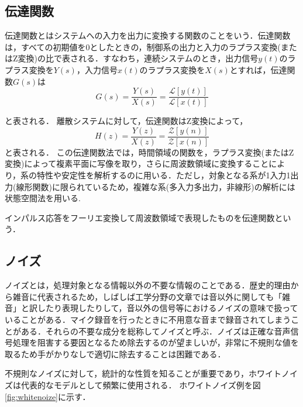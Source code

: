 \documentclass[a4j,11pt]{jsarticle}
\begin{document}
\subsection{伝達関数}
伝達関数とはシステムへの入力を出力に変換する関数のことをいう．伝達関数は，すべての初期値を0としたときの，制御系の出力と入力のラプラス変換(またはZ変換)の比で表される．すなわち，連続システムのとき，出力信号$y(t)$のラプラス変換を$Y(s)$，入力信号$x(t)$のラプラス変換を$X(s)$とすれば，伝達関数$G(s)$は
\begin{equation}
	\label{noref}
  G(s) =  \frac{Y(s)}{X(s)} = \frac{\mathcal{L}[y(t)]}{\mathcal{L}[x(t)]}
\end{equation}

と表される．
離散システムに対して，伝達関数はZ変換によって，
\begin{equation}
	\label{noref}
  H(z) =  \frac{Y(z)}{X(z)} = \frac{\mathcal{Z}[y(n)]}{\mathcal{Z}[x(n)]}
\end{equation}
と表される．
この伝達関数法では，時間領域の関数を，ラプラス変換(またはZ変換)によって複素平面に写像を取り，さらに周波数領域に変換することにより，系の特性や安定性を解析するのに用いる．ただし，対象となる系が1入力1出力(線形関数)に限られているため，複雑な系(多入力多出力，非線形)の解析には状態空間法を用いる.

インパルス応答をフーリエ変換して周波数領域で表現したものを伝達関数という．




\subsection{ノイズ}
ノイズとは，処理対象となる情報以外の不要な情報のことである．歴史的理由から雑音に代表されるため，しばしば工学分野の文章では音以外に関しても「雑音」と訳したり表現したりして，音以外の信号等におけるノイズの意味で扱っていることがある．マイク録音を行ったときに不用意な音まで録音されてしまうことがある．それらの不要な成分を総称してノイズと呼ぶ．ノイズは正確な音声信号処理を阻害する要因となるため除去するのが望ましいが，非常に不規則な値を取るため手がかりなしで適切に除去することは困難である．

不規則なノイズに対して，統計的な性質を知ることが重要であり，ホワイトノイズは代表的なモデルとして頻繁に使用される．
ホワイトノイズ例を図\ref{fig:whitenoize}に示す．
\end{document}
